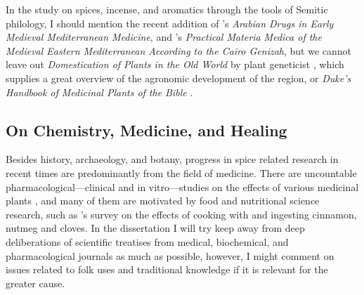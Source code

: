 In the study on spices, incense, and aromatics through the tools of Semitic philology, I should mention the recent addition of \textcite{amar_arabian_2017}'s \textit{Arabian Drugs in Early Medieval Mediterranean Medicine}, and \textcite{lev_practical_2008}'s \textit{Practical Materia Medica of the Medieval Eastern Mediterranean According to the Cairo Genizah}, but we cannot leave out \textit{Domestication of Plants in the Old World} by plant geneticist \textcite{zohary_domestication_2012}, which supplies a great overview of the agronomic development of the region, or \textit{Duke's Handbook of Medicinal Plants of the Bible} \autocite{duke_dukes_2008}.


\subsection{On Chemistry, Medicine, and Healing}

Besides history, archaeology, and botany, progress in spice related research in recent times are predominantly from the field of medicine. There are uncountable pharmacological---clinical and in vitro---studies on the effects of various medicinal plants \autocite{boy_recommended_2018}, and many of them are motivated by food and nutritional science research, such as \textcite{baker_impact_2013}'s survey on the effects of cooking with and ingesting cinnamon, nutmeg and cloves. In the dissertation I will try keep away from deep deliberations of scientific treatises from medical, biochemical, and pharmacological journals as much as possible, however, I might  comment on issues related to folk uses and traditional knowledge if it is relevant for the greater cause.

